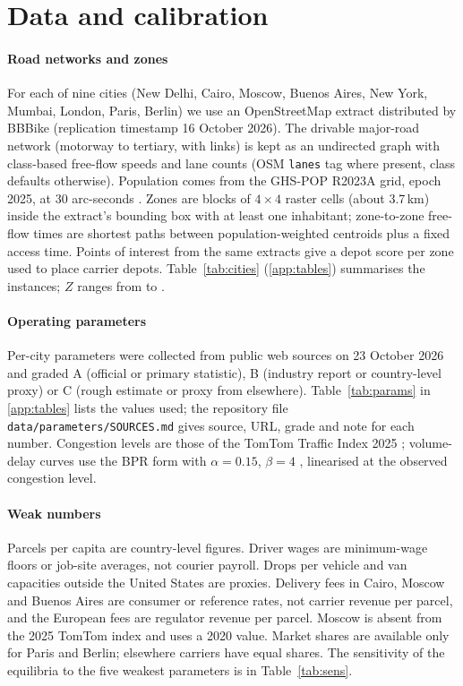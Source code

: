 \documentclass[preprint,12pt]{elsarticle}
\theoremstyle{definition}
\theoremstyle{remark}
\begin{document}
\section{Data and calibration}\label{sec:data}

\paragraph{Road networks and zones} For each of nine cities (New Delhi, Cairo, Moscow, Buenos Aires, New York, Mumbai, London, Paris, Berlin) we use an OpenStreetMap extract \citep{Haklay2008} distributed by BBBike (replication timestamp 16 October 2026). The drivable major-road network (motorway to tertiary, with links) is kept as an undirected graph with class-based free-flow speeds and lane counts (OSM \texttt{lanes} tag where present, class defaults otherwise). Population comes from the GHS-POP R2023A grid, epoch 2025, at 30 arc-seconds \citep{GHSPOP2023}. Zones are blocks of $4\times4$ raster cells (about 3.7\,km) inside the extract's bounding box with at least one inhabitant; zone-to-zone free-flow times are shortest paths between population-weighted centroids plus a fixed access time. Points of interest from the same extracts give a depot score per zone used to place carrier depots. Table~\ref{tab:cities} (\ref{app:tables}) summarises the instances; $Z$ ranges from \Zmin{} to \Zmax.


\paragraph{Operating parameters} Per-city parameters were collected from public web sources on 23 October 2026 and graded A (official or primary statistic), B (industry report or country-level proxy) or C (rough estimate or proxy from elsewhere). Table~\ref{tab:params} in \ref{app:tables} lists the values used; the repository file \texttt{data/parameters/SOURCES.md} gives source, URL, grade and note for each number. Congestion levels are those of the TomTom Traffic Index 2025 \citep{TomTom2025}; volume-delay curves use the BPR form with $\alpha=0.15$, $\beta=4$ \citep{BPR1964}, linearised at the observed congestion level.

\paragraph{Weak numbers} Parcels per capita are country-level figures. Driver wages are minimum-wage floors or job-site averages, not courier payroll. Drops per vehicle and van capacities outside the United States are proxies. Delivery fees in Cairo, Moscow and Buenos Aires are consumer or reference rates, not carrier revenue per parcel, and the European fees are regulator revenue per parcel. Moscow is absent from the 2025 TomTom index and uses a 2020 value. Market shares are available only for Paris and Berlin; elsewhere carriers have equal shares. The sensitivity of the equilibria to the five weakest parameters is in Table~\ref{tab:sens}.
\end{document}
